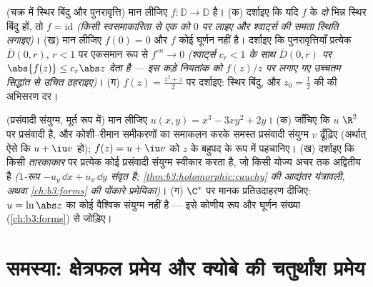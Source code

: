 \begin{exercise}[$\star\star$]\label{exo:b3:conformal:11}
(चक्र में स्थिर बिंदु और पुनरावृत्ति) मान लीजिए $f\colon\mathbb
D \to \mathbb D$
 है।
(क) दर्शाइए कि यदि $f$ के \emph{दो} भिन्न स्थिर बिंदु हों, तो
$f = \mathrm{id}$ \emph{(किसी स्वसमाकारिता से एक को $0$ पर लाइए और
श्वार्ट्स की समता स्थिति लगाइए)}।
(ख) मान लीजिए $f(0) = 0$ और $f$ कोई घूर्णन नहीं है। दर्शाइए कि
पुनरावृत्तियाँ प्रत्येक  $\bar D(0, r)$, $r < 1$ पर एकसमान रूप से $f^{\circ n} \to 0$
\emph{(श्वार्ट्स $c_r < 1$ के साथ $\bar D(0,r)$ पर $\abs{f(z)}
\leq c_r\abs z$ देता है --- इस कड़े
नियतांक को $f(z)/z$ पर लगाए गए उच्चतम सिद्धांत से उचित ठहराइए)}।
(ग) $f(z) = \frac{z^2 + z}2$ पर दर्शाइए: स्थिर बिंदु, और $z_0 =
\frac12$ की  की अभिसरण
दर।
\end{exercise}

\begin{exercise}[$\star\star$]\label{exo:b3:conformal:12}
(प्रसंवादी संयुग्म, मूर्त रूप में) मान लीजिए $u(x, y) = x^3 - 3xy^2
+ 2y$।
(क) जाँचिए कि $u$ $\R^2$ पर प्रसंवादी है, और कोशी--रीमान
समीकरणों का समाकलन करके समस्त प्रसंवादी संयुग्म $v$ ढूँढ़िए
(अर्थात् ऐसे कि $u + \iu v$  हो); $f(z) =
u + \iu v$ को $z$ के बहुपद
के रूप में पहचानिए।
(ख) दर्शाइए कि किसी \emph{तारकाकार}  पर प्रत्येक
 कोई प्रसंवादी संयुग्म स्वीकार करता है, जो किसी
योज्य अचर तक अद्वितीय है \emph{($1$-रूप $-u_y\,\dd x +
u_x\,\dd y$ संवृत है; \cref{thm:b3:holomorphic:cauchy}
की आद्यंतर यंत्रावली, अथवा \cref{ch:b3:forms} की पोंकारे प्रमेयिका)}।
(ग) $\C^*$ पर मानक प्रतिउदाहरण दीजिए: $u = \ln\abs z$ का कोई वैश्विक संयुग्म
नहीं है --- इसे कोणीय रूप और घूर्णन संख्या (\cref{ch:b3:forms}) से जोड़िए।
\end{exercise}

\section{समस्या: क्षेत्रफल प्रमेय और क्योबे की चतुर्थांश प्रमेय}

